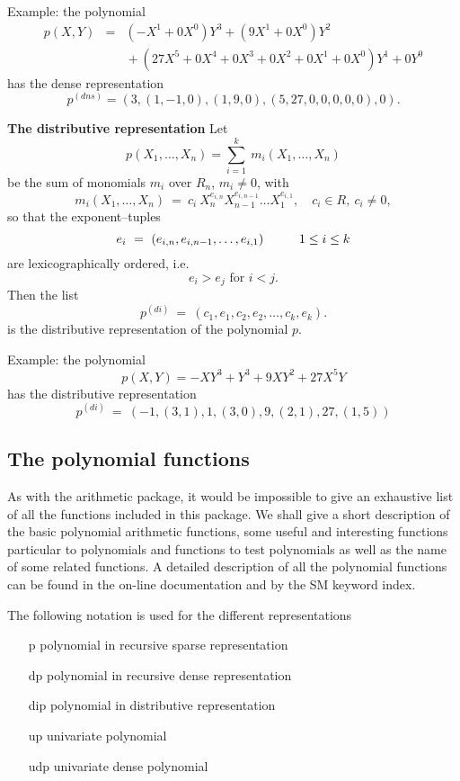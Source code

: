 Example: the polynomial 
\begin{eqnarray*} 
            p(X,Y) & = & (-X^1+0X^0) Y^3 + (9X^1+0X^0) Y^2\\
                   &   & {}+ (27X^5+0X^4+0X^3+0X^2+0X^1+0X^0) Y^1 + 0Y^0
\end{eqnarray*} 
has the dense representation 
$$         
      p^{(dns)} =  (3, (1,-1,0), (1,9,0), (5,27,0,0,0,0,0), 0).
$$

\newpage

{\bf The distributive representation}
\leer 
Let 
$$ 
     p(X_1,\ldots,X_n) = \sum_{i=1}^k\ m_i(X_1,\ldots,X_n) 
$$ 
be the sum of monomials $m_i$ over $R_n$, $m_i\not=0$, with 
$$ 
     m_i(X_1,\ldots,X_n)\ =\ c_i\ X_n^{e_{i,n}}X_{n-1}^{e_{i,n-1}}
     \ldots X_1^{e_{i,1}}, \quad  c_i \in  R,\ c_i\not=0,
$$ 
so that the exponent--tuples
$$ 
e_i\ =\ (e_{i,n}, e_{i,n-1}, \ldots, e_{i,1}) \hspace*{1cm} 1 \leq i \leq k
$$ 
are lexicographically ordered, i.e.\
$$ 
         e_i > e_j  \mbox{ for }  i<j.
$$ 
Then the list
$$ 
      p^{(di)}\  =\ (c_1 , e_1 , c_2 , e_2 , \ldots, c_k , e_k).
$$ 
is the distributive representation of the polynomial $p$.

Example: the polynomial
\begin{displaymath} 
            p(X,Y) =  - X Y^3 + Y^3 + 9 X Y^2 + 27 X^5 Y
\end{displaymath} 
has the distributive representation 
$$
       p^{(di)}\  =\  (-1, (3,1), 1, (3,0), 9, (2,1), 27, (1,5))
$$

\newpage

\subsection{The polynomial functions}

As with the arithmetic package, it would be impossible to give an exhaustive
list of all the functions included in this package. We shall give a short
description of the basic polynomial arithmetic functions, some useful and
interesting functions particular to polynomials and functions to test
polynomials as well as the name of some related functions. A detailed 
description of all the polynomial functions can be found in the on-line 
documentation and by the SM keyword index.

The following notation is used for the different representations
\begin{itemize}
\item[p] polynomial in recursive sparse representation
\item[dp] polynomial in recursive dense representation
\item[dip] polynomial in distributive representation
\item[up] univariate polynomial
\item[udp] univariate dense polynomial
\end{itemize}

